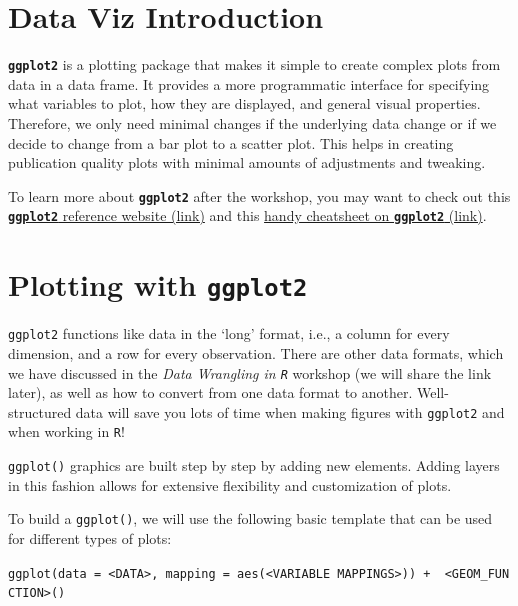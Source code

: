 \documentclass[
  10pt,
  letterpaper,
  twoside,
  openright]{book}
\begin{document}
\hypertarget{data-viz-introduction}{%
\section{Data Viz Introduction}\label{data-viz-introduction}}

\textbf{\texttt{ggplot2}} is a plotting package that makes it simple to
create complex plots from data in a data frame. It provides a more
programmatic interface for specifying what variables to plot, how they
are displayed, and general visual properties. Therefore, we only need
minimal changes if the underlying data change or if we decide to change
from a bar plot to a scatter plot. This helps in creating publication
quality plots with minimal amounts of adjustments and tweaking.

To learn more about \textbf{\texttt{ggplot2}} after the workshop, you
may want to check out this
\href{https://ggplot2.tidyverse.org/reference/}{\textbf{\texttt{ggplot2}}
reference website (link)} and this
\href{https://github.com/rstudio/cheatsheets/blob/main/data-visualization-2.1.pdf}{handy
cheatsheet on \textbf{\texttt{ggplot2}} (link)}.

\hypertarget{plotting-with-ggplot2}{%
\section{\texorpdfstring{Plotting with
\textbf{\texttt{ggplot2}}}{Plotting with ggplot2}}\label{plotting-with-ggplot2}}

\texttt{ggplot2} functions like data in the `long' format, i.e., a
column for every dimension, and a row for every observation. There are
other data formats, which we have discussed in the \emph{Data Wrangling
in \texttt{R}} workshop (we will share the link later), as well as how
to convert from one data format to another. Well-structured data will
save you lots of time when making figures with \texttt{ggplot2} and when
working in \texttt{R}!

\texttt{ggplot()} graphics are built step by step by adding new
elements. Adding layers in this fashion allows for extensive flexibility
and customization of plots.

To build a \texttt{ggplot()}, we will use the following basic template
that can be used for different types of plots:

\texttt{ggplot(data\ =\ \textless{}DATA\textgreater{},\ mapping\ =\ aes(\textless{}VARIABLE\ MAPPINGS\textgreater{}))\ +\ \ \textless{}GEOM\_FUNCTION\textgreater{}()}
\end{document}
